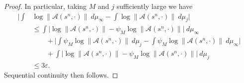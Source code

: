 \documentclass[10pt,reqno]{amsart}
\theoremstyle{Theorem}
\theoremstyle{definition}
\theoremstyle{remark}
\renewcommand{\epsilon}{\varepsilon}
\newcommand{\td}{\tilde}
\def\calA{\mathcal A}
\def\calM{\mathcal M}
\def\red{\color{red}}
\begin{document}
\begin{proof}
In particular, taking $M$ and $j$ sufficiently large we have
\begin{align*}
\Big|\int& \log \|\calA(s^n, \cdot )\|   \ d \mu_\infty  - \int \log \|\calA(s^n, \cdot )\| \ d \mu_j  \Big|
\\
&\le
\int \big|\log \|\calA(s^n, \cdot )\|  - \psi_M \log \|\calA(s^n, \cdot )\|\big|    \ d \mu_\infty  \\ &\quad\quad +
\Big|\int \psi_M  \log \|\calA(s^n, \cdot )\| \ d \mu_j  - \int \psi_M  \log \|\calA(s^n, \cdot )\| \ d \mu_\infty  \Big| \\ & \quad \quad +
\int \big|\log \|\calA(s^n, \cdot )\|  - \psi_M \log \|\calA(s^n, \cdot )\| \big|   \ d \mu_j    \\
&\le  3 \epsilon. %
\end{align*}
Sequential continuity then follows.
\end{proof}


\end{document}
